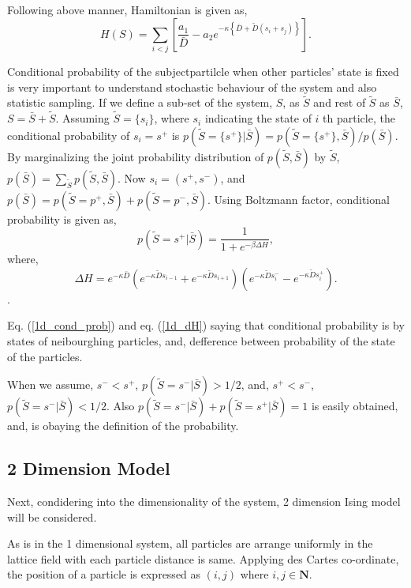\documentclass{article}
\begin{document}
Following above manner, Hamiltonian is given as,
\begin{equation}
 H(S) = \sum_{i<j} \left[\frac{a_1}{\bar{D}} - a_2 e^{-\kappa \left\{\bar{D} + \tilde{D} (s_i + s_j)\right\}}\right].  \label{1d_H}
\end{equation}

Conditional probability of the subjectpartilcle when other particles' state is fixed is very important to understand 
stochastic behaviour of the system and also statistic sampling.
If we define a sub-set of the system, $S$, as $\tilde{S}$ and rest of $\tilde{S}$ as $\bar{S}$,
$S = \bar{S} + \tilde{S}$. Assuming $\tilde{S} = \{s_i\}$, where $s_i$ indicating the state of $i$ th particle,
the conditional probability of $s_i = s^+$ is $p(\tilde{S}=\{s^+\}|\bar{S}) = p(\tilde{S}=\{s^+\}, \bar{S}) / p (\bar{S})$.
By marginalizing the joint probability distribution of $p(\tilde{S}, \bar{S})$ by $\tilde{S}$, 
$p (\bar{S}) = \sum_{\tilde{S}} p(\tilde{S}, \bar{S})$. 
Now $s_i = (s^+, s^-)$, and $p (\bar{S}) = p(\tilde{S} = p^+, \bar{S}) + p(\tilde{S} = p^-, \bar{S})$.
Using Boltzmann factor, conditional probability is given as,
\begin{equation}
 p (\tilde{S} = s^+|\bar{S}) = 
  \frac{1}{1 + e^{-\beta \Delta H}}, \label{1d_cond_prob}
\end{equation}
where, 
\begin{equation}
 \Delta H = e^{-\kappa \bar{D}} \left(e^{-\kappa \tilde{D} s_{i-1}} + e^{-\kappa \tilde{D} s_{i+1}}\right)
  \left(e^{-\kappa \tilde{D} s_i^-} - e^{-\kappa \tilde{D} s_i^+}\right).  \label{1d_dH}
\end{equation}.

Eq. (\ref{1d_cond_prob}) and eq. (\ref{1d_dH}) saying that conditional probability is by states of neibourghing particles, 
and, defference between probability of the state of the particles.

When we assume, $s^- < s^+$, $p(\tilde{S} = s^-|\bar{S}) > 1/2$, and, $s^+ < s^-$, $p(\tilde{S} = s^-|\bar{S}) < 1/2$.
Also $p(\tilde{S} = s^-|\bar{S}) + p(\tilde{S} = s^+|\bar{S}) = 1$ is easily obtained, and, is obaying the definition of the probability.


\subsection{2 Dimension Model}
Next, condidering into the dimensionality of the system, 2 dimension Ising model will be considered.

As is in the 1 dimensional system, all particles are arrange uniformly in the lattice field with each particle distance is same.
Applying des Cartes co-ordinate, the position of a particle is expressed as $(i, j)$ where $i, j \in \mathbf{N}$.
\end{document}
